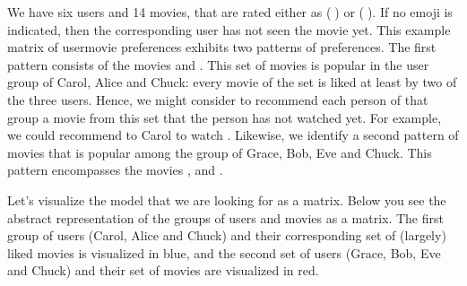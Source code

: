 \documentclass[letterpaper,10pt,english]{jupyterBook}
\begin{document}
\sphinxAtStartPar
We have six users and 14 movies, that are rated either as  (🤩) or  (🙈). If no emoji is indicated, then the corresponding user has not seen the movie yet. This example matrix of user\sphinxhyphen{}movie preferences exhibits two patterns of preferences. The first pattern consists of the movies  and . This set of movies is popular in the user group of Carol, Alice and Chuck: every movie of the set is liked at least by two of the three users. Hence, we might consider to recommend each person of that group a movie from this set that the person has not watched yet. For example, we could recommend to Carol to watch .
Likewise, we identify a second pattern of movies that is popular among the group of Grace, Bob, Eve and Chuck. This pattern encompasses the movies , and .

\sphinxAtStartPar
Let’s visualize the model that we are looking for as a matrix. Below you see the abstract representation of the groups of users and movies as a matrix. The first group of users (Carol, Alice and Chuck) and their corresponding set of (largely) liked movies is visualized in blue, and the second set of users (Grace, Bob, Eve and Chuck) and their set of movies are visualized in red.
\end{document}
